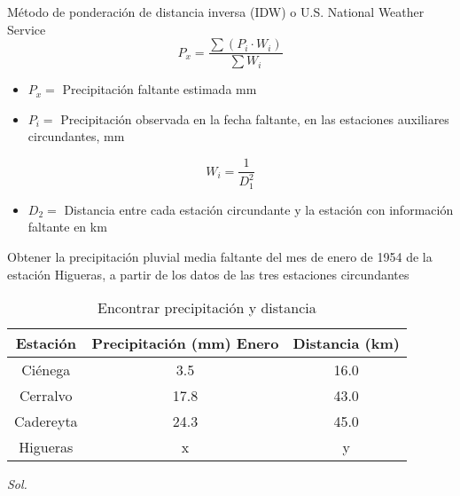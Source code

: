     Método de ponderación de distancia inversa (IDW) o U.S. National Weather Service
    \begin{equation}
        P_x = \frac{\sum\left(P_i \cdot W_i\right)}{\sum W_i}
    \end{equation}
    \begin{notation}
        \begin{itemize}
            \item $P_x=$ Precipitación faltante estimada mm
            \item $P_i=$ Precipitación observada en la fecha faltante, en las estaciones auxiliares circundantes, mm
        \end{itemize}
    \end{notation}
    \begin{equation}
        W_i = \frac{1}{D_1^2}
    \end{equation}
    \begin{notation}
        \begin{itemize}
            \item $D_2=$ Distancia entre cada estación circundante y la estación con información faltante en km
    \end{itemize}
\end{notation}
    \begin{example}
        Obtener la precipitación pluvial media faltante del mes de enero de 1954 de la estación Higueras, a partir de los datos de las tres estaciones circundantes
    \end{example}
    \begin{table}[h!]
        \centering
        \begin{tabular}{@{}ccc@{}}
        \toprule
        Estación  & Precipitación (mm) Enero & Distancia (km) \\ \midrule
        Ciénega   & 3.5                      & 16.0           \\
        Cerralvo  & 17.8                     & 43.0           \\
        Cadereyta & 24.3                     & 45.0           \\
        Higueras  & x                        & y              \\ \bottomrule
        \end{tabular}
        \caption{Encontrar precipitación y distancia}
        \label{tabtua1}
    \end{table}
    \textit{ Sol. }
